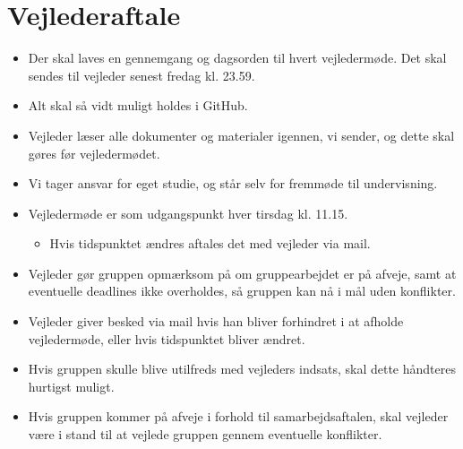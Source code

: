 \section{Vejlederaftale}
\begin{itemize}
    \item Der skal laves en gennemgang og dagsorden til hvert vejledermøde. Det skal sendes til vejleder senest fredag kl. 23.59.
    \item Alt skal så vidt muligt holdes i GitHub.
    \item Vejleder læser alle dokumenter og materialer igennen, vi sender, og dette skal gøres før vejledermødet.
    \item Vi tager ansvar for eget studie, og står selv for fremmøde til undervisning.
    \item Vejledermøde er som udgangspunkt hver tirsdag kl. 11.15.
    \begin{itemize}
        \item Hvis tidspunktet ændres aftales det med vejleder via mail.
    \end{itemize}
    \item Vejleder gør gruppen opmærksom på om gruppearbejdet er på afveje, samt at eventuelle deadlines ikke overholdes, så gruppen kan nå i mål uden konflikter.
    \item Vejleder giver besked via mail hvis han bliver forhindret i at afholde vejledermøde, eller hvis tidspunktet bliver ændret.
    \item Hvis gruppen skulle blive utilfreds med vejleders indsats, skal dette håndteres hurtigst muligt.
    \item Hvis gruppen kommer på afveje i forhold til samarbejdsaftalen, skal vejleder være i stand til at vejlede gruppen gennem eventuelle konflikter.
\end{itemize}